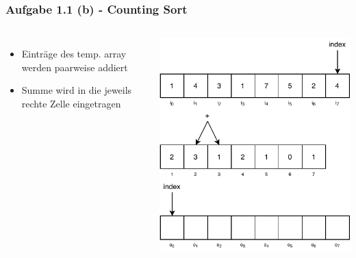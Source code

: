 \documentclass[aspectratio=169]{beamer}
\begin{document}
\begin{frame}
	\frametitle{Aufgabe 1.1 (b) - Counting Sort}
	\begin{columns}[c] %
	
	\begin{itemize}
		\item Einträge des temp. array werden paarweise addiert
		\item Summe wird in die jeweils rechte Zelle eingetragen
	\end{itemize}
	
	\includegraphics[scale=.7]{cs7.pdf}
	
	\end{columns}
	\end{frame}
\end{document}
